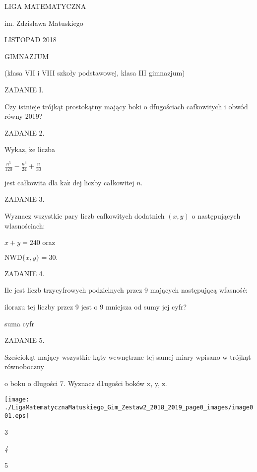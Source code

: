 \documentclass[a4paper,12pt]{article}
\begin{document}
LIGA MATEMATYCZNA

im. Zdzisława Matuskiego

LISTOPAD 2018

GIMNAZJUM

(klasa VII i VIII szkoły podstawowej, klasa III gimnazjum)

ZADANIE I.

Czy istnieje trójkąt prostokątny mający boki o dfugościach cafkowitych i obwód równy 2019?

ZADANIE 2.

Wykaz, $\dot{\mathrm{z}}\mathrm{e}$ liczba

$\displaystyle \frac{n^{5}}{120}-\frac{n^{3}}{24}+\frac{n}{30}$

jest całkowita dla $\mathrm{k}\mathrm{a}\dot{\mathrm{z}}$ dej liczby całkowitej $n.$

ZADANIE 3.

Wyznacz wszystkie pary liczb cafkowitych dodatnich $(x,y)$ o następujących wlasnościach:

$x+y=240$ oraz

$\mathrm{N}\mathrm{W}\mathrm{D}\{x,y\}=30.$

ZADANIE 4.

Ile jest liczb trzycyfrowych podzielnych przez 9 mających następującą wfasność:

ilorazu tej liczby przez 9 jest o 9 mniejsza od sumy jej cyfr?

suma cyfr

ZADANIE 5.

Sześciokąt mający wszystkie kąty wewnętrzne tej samej miary wpisano w trójkąt równoboczny

o boku o dlugości 7. Wyznacz d1ugości boków x, y, z.
\begin{center}
\texttt{[image: ./LigaMatematycznaMatuskiego\_Gim\_Zestaw2\_2018\_2019\_page0\_images/image001.eps]}
\end{center}
3

{\it 4}

5
\end{document}
